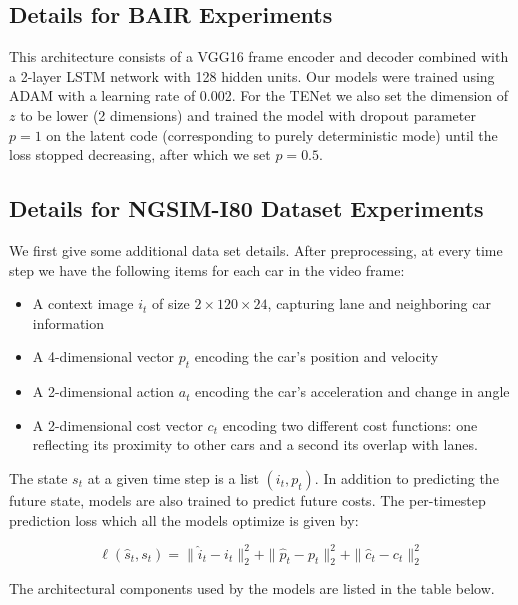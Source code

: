 \documentclass{article}
\newcommand{\modelname}{TENet }
\begin{document}
\begin{appendices}
\subsection{Details for BAIR Experiments}
\label{bair-details}

This architecture consists of a VGG16 frame encoder and decoder combined with a 2-layer LSTM network with 128 hidden units.
Our models were trained using ADAM \citep{ADAM} with a learning rate of 0.002.
For the \modelname we also set the dimension of $z$ to be lower (2 dimensions) and trained the model with dropout parameter $p=1$ on the latent code (corresponding to purely deterministic mode) until the loss stopped decreasing, after which we set $p=0.5$.

\subsection{Details for NGSIM-I80 Dataset Experiments}

We first give some additional data set details.
After preprocessing, at every time step we have the following items for each car in the video frame:

\begin{itemize}
\item A context image $i_t$ of size $2 \times 120 \times 24$, capturing lane and neighboring car information
\item A 4-dimensional vector $p_t$ encoding the car's position and velocity
\item A 2-dimensional action $a_t$ encoding the car's acceleration and change in angle
\item A 2-dimensional cost vector $c_t$ encoding two different cost functions: one reflecting its proximity to other cars and a second its overlap with lanes.
\end{itemize}

The state $s_t$ at a given time step is a list $(i_t, p_t)$.
In addition to predicting the future state, models are also trained to predict future costs.
The per-timestep prediction loss which all the models optimize is given by:

\begin{equation}
\ell(\hat{s}_t, s_t) = \|\hat{i}_t - i_t \|_2^2 + \| \hat{p}_t - p_t \|_2^2 + \| \hat{c}_t - c_t \|_2^2
\end{equation}

The architectural components used by the models are listed in the table below.


\end{appendices}
\end{document}
